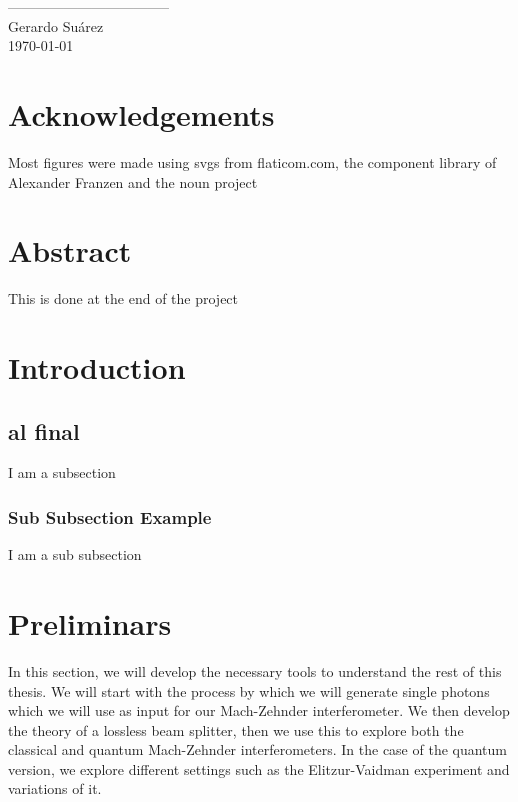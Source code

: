 \documentclass[12pt]{article}
\begin{document}
\vspace{2cm}
\begin{flushright}
-----------------------------------\\
Gerardo Suárez\\
\today
\end{flushright}
\pagebreak

\listoffigures\newpage
{}
\listoftables\newpage
\blankpage{}
\section*{Acknowledgements}
Most figures were made using svgs from flaticom.com, the component library of Alexander Franzen and the noun project

\pagebreak



\blankpage{}

\section*{Abstract}
This is done at the end of the project


\pagebreak


\blankpage{}

\section{Introduction}
\subsection{al final}
I am a subsection
\subsubsection{Sub Subsection Example}
I am a sub subsection
\pagebreak

\blankpage{}


\section{Preliminars}

In this section, we will develop the necessary tools to understand the rest of this thesis. We will start with the process by which we will generate single photons which we will use as input for our Mach-Zehnder interferometer. We then develop the theory of a lossless beam splitter, then we use this to explore both the classical and quantum Mach-Zehnder interferometers. In the case of the quantum version, we explore different settings such as the Elitzur-Vaidman experiment and variations of it.
\end{document}
